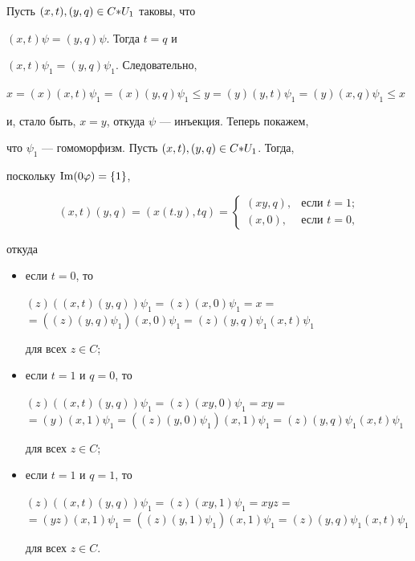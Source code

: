 \begin{pf}
Пусть $(x,t),(y,q)\in C{*} U_1$ таковы, что


$(x,t)\psi=(y,q)\psi$. Тогда $t=q$ и


$(x,t)\psi_1=(y,q)\psi_1$. Следовательно,


$x=(x)(x,t)\psi_1=(x)(y,q)\psi_1\le y=(y)(y,t)\psi_1=(y)(x,q)\psi_1\le x$


и, стало быть, $x=y$, откуда $\psi$ --- инъекция. Теперь покажем,


что $\psi_1$ --- гомоморфизм. Пусть $(x,t),(y,q)\in C{*} U_1$. Тогда,


поскольку $\operatorname{Im}(0\varphi)=\{1\}$,


$$


(x,t)(y,q)=(x(t.y),tq)=


\begin{cases}


(xy,q), &\text{если $t=1$;}\\


(x,0), &\text{если $t=0$,}


\end{cases}


$$


откуда


\begin{itemize}


\item[1.] если $t=0$, то


$(z)((x,t)(y,q))\psi_1=(z)(x,0)\psi_1=x=$\\


$=((z)(y,q)\psi_1)(x,0)\psi_1=(z)(y,q)\psi_1(x,t)\psi_1$


для всех $z\in C$;


\item[2.] если $t=1$ и $q=0$, то


$(z)((x,t)(y,q))\psi_1=(z)(xy,0)\psi_1=xy=$\\


$=(y)(x,1)\psi_1=((z)(y,0)\psi_1)(x,1)\psi_1=(z)(y,q)\psi_1(x,t)\psi_1$


для всех $z\in C$;


\item[3.] если $t=1$ и $q=1$, то


$(z)((x,t)(y,q))\psi_1=(z)(xy,1)\psi_1=xyz=$\\


$=(yz)(x,1)\psi_1=((z)(y,1)\psi_1)(x,1)\psi_1=(z)(y,q)\psi_1(x,t)\psi_1$


для всех $z\in C$.


\end{itemize}



\end{pf}
